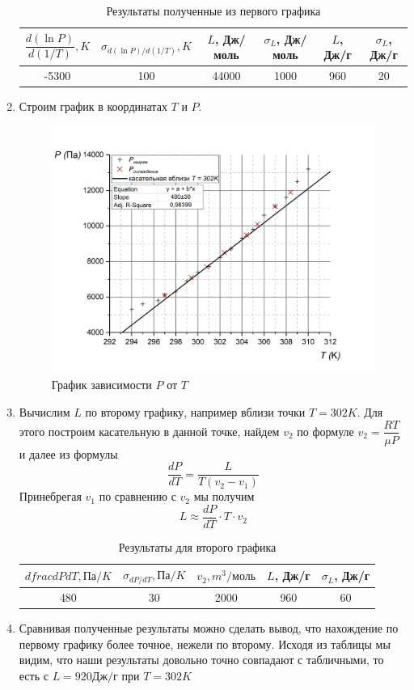 \documentclass[a4paper, 12pt]{article}%
\begin{document}
\begin{enumerate}
\begin{table}[h]
\begin{tabular}{|c|c|c|c|c|c|}
\hline
$\dfrac{d(\ln P)}{d(1/T)}, K$ & $\sigma_{d(\ln P)/d(1/T)}, K$ & $L$, Дж/моль & $\sigma_L$, Дж/моль & $L$, Дж/г & $\sigma_L$, Дж/г \\ \hline
-5300 & 100 & 44000 & 1000 & 960 & 20 \\ \hline
\end{tabular}
\caption{Результаты полученные из первого графика}
\end{table} 
\newpage
\item Строим график в координатах $T$ и $P$.
\begin{figure}[h]
\includegraphics[width = \textwidth]{3.jpg}
\caption{График зависимости $P$ от $T$}
\end{figure} 
\item Вычислим $L$ по второму графику, например вблизи точки $T = 302K$. Для этого построим касательную в данной точке, найдем $v_2$ по формуле $v_2 = \dfrac{RT}{\mu P}$ и далее из формулы 
\[\dfrac{dP}{dT} = \dfrac{L}{T(v_2 - v_1)}\]
Принебрегая $v_1$ по сравнению с $v_2$ мы получим 
\[L \approx \dfrac{dP}{dT} \cdot T \cdot v_2\]
\begin{table}[h]
\begin{tabular}{|c|c|c|c|c|}
\hline
$dfrac{dP}{dT},\text{Па}/K$ & $\sigma_{dP/dT},  \text{Па}/K$ & $v_2, m^3/ \text{моль}$ & $L$, Дж/г & $\sigma_L$, Дж/г \\ \hline
480 & 30 & 2000 & 960 & 60 \\ \hline
\end{tabular}
\caption{Результаты для второго графика}
\end{table}
\item Сравнивая полученные результаты можно сделать вывод, что нахождение по первому графику более точное, нежели по второму. Исходя из таблицы мы видим, что наши результаты довольно точно совпадают с табличными, то есть с $L = 920 \text{Дж}/\text{г}$ при $T = 302 K$
\end{enumerate}
\end{document}
